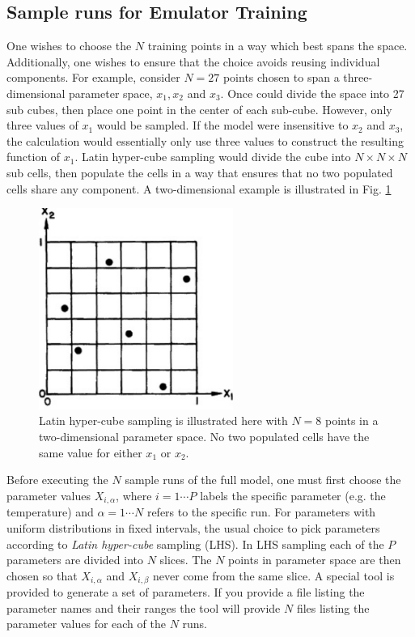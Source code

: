 \subsection{Sample runs for Emulator Training}
One wishes to choose the $N$ training points in a way which best spans the space. Additionally, one wishes to ensure that the choice avoids reusing individual components. For example, consider $N=27$ points chosen to span a three-dimensional parameter space, $x_1,x_2$ and $x_3$. Once could divide the space into 27 sub cubes, then place one point in the center of each sub-cube. However, only three values of $x_1$ would be sampled. If the model were insensitive to $x_2$ and $x_3$, the calculation would essentially only use three values to construct the resulting function of $x_1$. Latin hyper-cube sampling would divide the cube into $N\times N\times N$ sub cells, then populate the cells in a way that ensures that no two populated cells share any component. A two-dimensional example is illustrated in Fig. \ref{fig:hypercube}

\noindent
\begin{figure}
\includegraphics[width=2.5in]{figs/hypercube}
\parbox[b]{4.5in}
{\caption{\label{fig:hypercube}
Latin hyper-cube sampling is illustrated here with $N=8$ points in a two-dimensional parameter space. No two populated cells have the same value for either $x_1$ or $x_2$.}
\vspace*{60pt}
}

\end{figure}

Before executing the $N$ sample runs of the full model, one must first choose the parameter values $X_{i,\alpha}$, where $i=1\cdots P$ labels the specific parameter (e.g. the temperature) and $\alpha=1\cdots N$ refers to the specific run. For parameters with uniform distributions in fixed intervals, the usual choice to pick parameters according to {\it Latin hyper-cube} sampling (LHS). In LHS sampling each of the $P$ parameters are divided into $N$ slices. The $N$ points in parameter space are then chosen so that $X_{i,\alpha}$ and $X_{i,\beta}$ never come from the same slice.
A special tool is provided to generate a set of parameters. If you provide a file listing the parameter names and their ranges the tool will provide $N$ files listing the parameter values for each of the $N$ runs.

